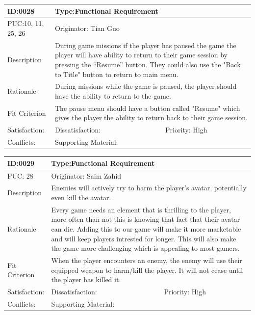 \documentclass{article}
\begin{document}
	\begin{table}[H]
		\begin{tabular}{|l|l|l|}
			\hline
			ID:0028 & \multicolumn{2}{l|}{Type:Functional Requirement} \\ \hline
			PUC:10, 11, 25, 26 & \multicolumn{2}{l|}{Originator: Tian Guo} \\ \hline
			Description & \multicolumn{2}{m{0.85\textwidth}|}{During game missions if the player has paused the game the player will have ability to return to their game session by pressing the “Resume” button. They could also use the "Back to Title" button to return to main menu.} \\ \hline
			Rationale & \multicolumn{2}{m{0.85\textwidth}|}{During missions while the game is paused, the player should have the ability to return to the game.} \\ \hline
			Fit Criterion & \multicolumn{2}{m{0.85\textwidth}|}{The pause menu should have a button called "Resume" which gives the
			player the ability to return back to their game session.} \\ \hline
			Satisfaction: & Dissatisfaction: & Priority: High\\ \hline
			Conflicts: & \multicolumn{2}{l|}{Supporting Material:} \\ \hline
		\end{tabular}
	\end{table}

	\begin{table}[H]
		\begin{tabular}{|l|l|l|}
			\hline
			ID:0029 & \multicolumn{2}{l|}{Type:Functional Requirement} \\ \hline
			PUC: 28 & \multicolumn{2}{l|}{Originator: Saim Zahid} \\ \hline
			Description & \multicolumn{2}{m{0.85\textwidth}|}{Enemies will actively try to harm the player's avatar, potentially even kill the avatar.} \\ \hline
			Rationale & \multicolumn{2}{m{0.85\textwidth}|}{Every game needs an element that is thrilling to the player, more often than not this is knowing that fact that their avatar can die. Adding this to our game will make it more marketable and will keep players intrested for longer. This will also make the game more challenging which is appealing to most gamers.} \\ \hline
			Fit Criterion & \multicolumn{2}{m{0.85\textwidth}|}{When the player encounters an enemy, the enemy will use their equipped weapon to harm/kill the player. It will not cease until the player has killed it.} \\ \hline
			Satisfaction: & Dissatisfaction: & Priority: High\\ \hline
			Conflicts: & \multicolumn{2}{l|}{Supporting Material:} \\ \hline
		\end{tabular}
	\end{table}
\end{document}
